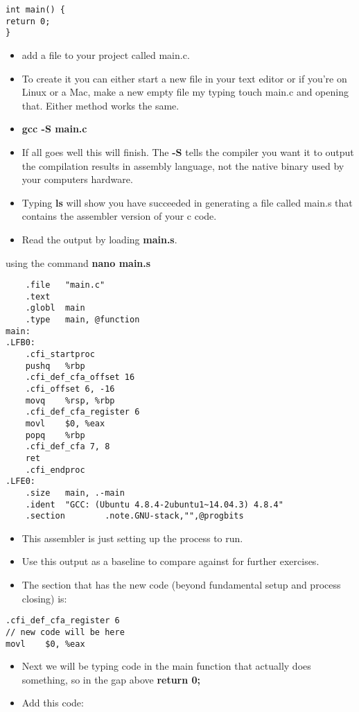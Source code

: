 \documentclass[minimal, t]{article}
\begin{document}
\begin{verbatim}
int main() {
return 0;
}
\end{verbatim}
\begin{itemize}
\item add a file to your project called main.c.
\item To create it you can either start a new file in your text editor or if you’re
on Linux or a Mac, make a new empty file my typing touch main.c and opening
that. Either method works the same.
\item \textbf{gcc -S main.c}
\item If all goes well this will finish.  The \textbf{-S} tells the compiler you want it to
output the compilation results in assembly language, not the native binary
used by your computers hardware.
\item Typing \textbf{ls} will show you have succeeded in generating a file called main.s
that contains the assembler version of your c code.
\item Read the output by loading \textbf{main.s}.
\end{itemize}
using the command \textbf{nano main.s}
\begin{verbatim}
	.file   "main.c"
	.text
	.globl  main
	.type   main, @function
main:
.LFB0:
	.cfi_startproc
	pushq   %rbp
	.cfi_def_cfa_offset 16
	.cfi_offset 6, -16
	movq    %rsp, %rbp
	.cfi_def_cfa_register 6
	movl    $0, %eax
	popq    %rbp
	.cfi_def_cfa 7, 8
	ret
	.cfi_endproc
.LFE0:
	.size   main, .-main
	.ident  "GCC: (Ubuntu 4.8.4-2ubuntu1~14.04.3) 4.8.4"
	.section        .note.GNU-stack,"",@progbits
\end{verbatim}
\begin{itemize}
\item This assembler is just setting up the process to run.
\item Use this output as a baseline to compare against for further exercises.
\item The section that has the new code (beyond fundamental setup and process
closing) is:
\end{itemize}
\begin{verbatim}
.cfi_def_cfa_register 6
// new code will be here
movl    $0, %eax
\end{verbatim}
\begin{itemize}
\item Next we will be typing code in the main function that actually does
something, so in the gap above
\textbf{return 0;}
\item Add this code:
\end{itemize}
\end{document}
